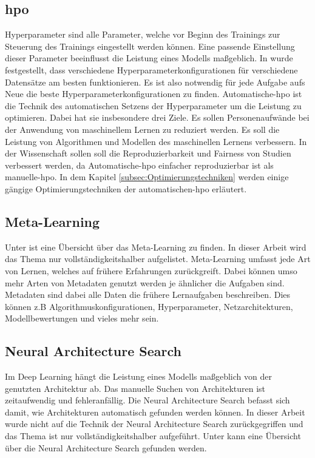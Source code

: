 	\subsection{\acl{hpo}}
	\label{subsec:HyperparameterOptimierung}	
	Hyperparameter sind alle Parameter, welche vor Beginn des Trainings zur Steuerung des Trainings eingestellt werden können. Eine passende Einstellung dieser Parameter beeinflusst die Leistung eines Modells maßgeblich. In \cite{Kohavi.1995} wurde festgestellt, dass verschiedene Hyperparameterkonfigurationen für verschiedene Datensätze am besten funktionieren. Es ist also notwendig für jede Aufgabe aufs Neue die beste Hyperparameterkonfigurationen zu finden.      
	Automatische-\ac{hpo} ist die Technik des automatischen Setzens der Hyperparameter um die Leistung zu optimieren. Dabei hat sie insbesondere drei Ziele. Es sollen Personenaufwände bei der Anwendung von maschinellem Lernen zu reduziert werden. Es soll die Leistung von Algorithmen und Modellen des maschinellen Lernens verbessern. In der Wissenschaft sollen soll die Reproduzierbarkeit und Fairness von Studien verbessert werden, da Automatische-\ac{hpo} einfacher reproduzierbar ist als manuelle-\ac{hpo}. In dem Kapitel \ref{subsec:Optimierungstechniken} werden einige gängige Optimierungstechniken der automatischen-\ac{hpo} erläutert.  \cite{Feurer.2019}		
	
	
	\subsection{Meta-Learning}
	\label{subsec:MetaLearning}
	Unter \cite{JoaquinVanschoren.2018} ist eine Übersicht über das Meta-Learning zu finden. In dieser Arbeit wird das Thema nur vollständigkeitshalber aufgelistet. Meta-Learning umfasst jede Art von Lernen, welches auf frühere Erfahrungen zurückgreift. Dabei können umso mehr Arten von Metadaten genutzt werden je ähnlicher die Aufgaben sind. Metadaten sind dabei alle Daten die frühere Lernaufgaben beschreiben. Dies können z.B Algorithmuskonfigurationen, Hyperparameter, Netzarchitekturen, Modellbewertungen und vieles mehr sein.
	
	\subsection{Neural Architecture Search}
	\label{subsec:NeuralArchitectureSearch}
	Im Deep Learning hängt die Leistung eines Modells maßgeblich von der genutzten Architektur ab. Das manuelle Suchen von Architekturen ist zeitaufwendig und fehleranfällig. Die Neural Architecture Search befasst sich damit, wie Architekturen automatisch gefunden werden können. In dieser Arbeit wurde nicht auf die Technik der Neural Architecture Search zurückgegriffen und das Thema ist nur vollständigkeitshalber aufgeführt. Unter \cite{Elsken.2019} kann eine Übersicht über die Neural Architecture Search gefunden werden. 	

